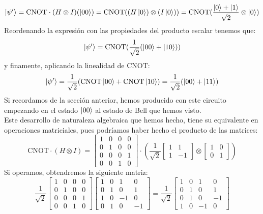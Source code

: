 \documentclass[a4paper]{article}
\numberwithin{equation}{section}
\begin{document}
\begin{equation}
\ket{\psi'} = \textrm{CNOT}\cdot(H\otimes I)(\ket{00}) = \textrm{CNOT}((H\ket{0}) \otimes (I\ket{0})) = \textrm{CNOT}(\frac{\ket{0}+\ket{1}}{\sqrt{2}}\otimes\ket{0})
\end{equation}
Reordenando la expresión con las propiedades del producto escalar tenemos que:
\begin{equation}
\ket{\psi'} = \textrm{CNOT}(\frac{1}{\sqrt{2}}(\ket{00} + \ket{10}))
\end{equation}
y finamente, aplicando la linealidad de CNOT:
\begin{equation}
\ket{\psi'} = \frac{1}{\sqrt{2}}(\textrm{CNOT}\ket{00} + \textrm{CNOT}\ket{10}) = \frac{1}{\sqrt{2}}(\ket{00} + \ket{11})
\end{equation}
Si recordamos de la sección anterior, hemos producido con este circuito empezando en el estado $\ket{00}$ al estado de Bell que hemos visto.\\
Este desarrollo de naturaleza algebraica que hemos hecho, tiene su equivalente en operaciones matriciales, pues podríamos haber hecho el producto de las matrices:
\begin{equation}
\textrm{CNOT}\cdot(H\otimes I) = \begin{bmatrix}
1 & 0 & 0 & 0 \\
0 & 1 & 0 & 0 \\
0 & 0 & 0 & 1 \\
0 & 0 & 1 & 0 
\end{bmatrix} \cdot \left( \frac{1}{\sqrt{2}}
\begin{bmatrix}
1 & 1 \\
1 & -1 
\end{bmatrix} \otimes
\begin{bmatrix}
1 & 0 \\
0 & 1 
\end{bmatrix}\right)
\end{equation}
Si operamos, obtendremos la siguiente matriz:
\begin{equation}
\frac{1}{\sqrt{2}}
\begin{bmatrix}
1 & 0 & 0 & 0 \\
0 & 1 & 0 & 0 \\
0 & 0 & 0 & 1 \\
0 & 0 & 1 & 0 
\end{bmatrix}
\begin{bmatrix}
1 & 0 & 1 & 0 \\
0 & 1 & 0 & 1 \\
1 & 0 & -1 & 0 \\
0 & 1 & 0 & -1 
\end{bmatrix} =
\frac{1}{\sqrt{2}}
\begin{bmatrix}
1 & 0 & 1 & 0 \\
0 & 1 & 0 & 1 \\
0 & 1 & 0 & -1 \\
1 & 0 & -1 & 0
\end{bmatrix}
\end{equation}
\end{document}
